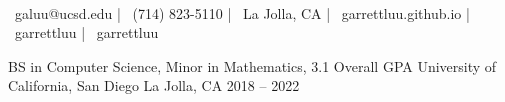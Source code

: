 \documentclass[]{awesome-cv}
\begin{document}
\begin{center}
	\vspace{-5mm}
	  \\
	\vspace{2mm}
  {\faEnvelope\ galuu@ucsd.edu} | {\faMobile\ (714) 823-5110} |
  {\faMapMarker\ La Jolla, CA} | {\faLink\ garrettluu.github.io} |
  {\faGithub\ garrettluu} | {\faLinkedinSquare\ garrettluu}
\end{center}
\vspace{-3mm}
\begin{cventries}
	\cventry
	{BS in Computer Science, Minor in Mathematics, 3.1 Overall GPA}
	{University of California, San Diego}
	{La Jolla, CA}
	{2018 – 2022}
	{}
\end{cventries}
\end{document}
